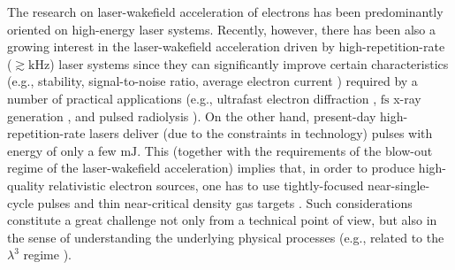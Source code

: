 \documentclass[10pt, a4paper, twoside, openright]{report}
\begin{document}

The research on laser-wakefield acceleration of electrons has been predominantly oriented on high-energy laser systems. Recently, however, there has been also a growing interest in the laser-wakefield acceleration driven by high-repetition-rate ($ \gtrsim \mathrm{kHz} $) laser systems \cite{Salehi2017, Guenot2017, Gustas2018, Salehi2021} since they can significantly improve certain characteristics (e.g., stability, signal-to-noise ratio, average electron current \cite{Faure2018}) required by a number of practical applications (e.g., ultrafast electron diffraction \cite{Sciaini2011, Miller2014}, $ \mathrm{fs} $ x-ray generation \cite{TaPhuoc2012, Corde2013}, and pulsed radiolysis \cite{Muroya2008}). On the other hand, present-day high-repetition-rate lasers deliver (due to the constraints in technology) pulses with energy of only a few $ \mathrm{mJ} $. This (together with the requirements of the blow-out regime of the laser-wakefield acceleration) implies that, in order to produce high-quality relativistic electron sources, one has to use tightly-focused near-single-cycle pulses and thin near-critical density gas targets \cite{Faure2018, Salehi2019}. Such considerations constitute a great challenge not only from a technical point of view, but also in the sense of understanding the underlying physical processes (e.g., related to the $ \lambda^{3} $ regime \cite{Mourou2002, Naumova2004}).
\end{document}

